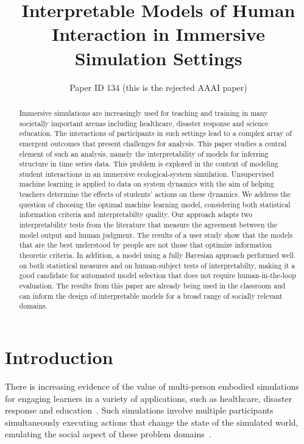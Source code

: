\documentclass[letterpaper]{article} %
\title{Interpretable Models of Human Interaction in Immersive Simulation Settings}
\author{Paper ID 134 (this is the rejected AAAI paper)}
\begin{document}
\maketitle


\begin{abstract}
Immersive simulations are increasingly used for teaching and training in many societally important arenas including healthcare, disaster response and science education.
The interactions of participants in such settings lead to a complex array of emergent  outcomes that present challenges for analysis.
This paper studies a central element of such an analysis, namely the interpretability of models for inferring structure in time series data.
This problem is explored in the context of modeling student interactions in an immersive ecological-system simulation.
Unsupervised machine learning is applied to data on system dynamics with the aim of helping teachers determine the effects of students' actions on these dynamics.
We address the question of choosing the optimal machine learning model, considering both statistical information criteria and interpretabilty quality.
Our approach adapts two interpretability tests from the literature that measure the agreement between the model output and human judgment.
The results of a user study show that the models that are  the best understood by  people are not those that optimize information theoretic criteria.
In addition, a model using a fully Bayesian approach performed well on both statistical measures and on human-subject tests of interpretabilty, making it a good candidate for automated model selection that does not require human-in-the-loop evaluation.
The results from this paper are already being used in the classroom and can inform the design of interpretable models for a broad range of socially relevant domains.
\end{abstract}



\section{Introduction}
\label{sec:introduction}
There is increasing evidence of the value of multi-person embodied simulations for engaging learners in a variety of
applications, such as healthcare, disaster response and education~\cite{alinier2014immersive,amir2013plan}.
Such simulations involve multiple participants simultaneously executing actions that change the state of the simulated world, emulating the social aspect of these problem domains~\cite{smordal2012hybrid}.
\end{document}
